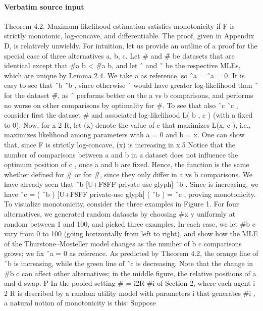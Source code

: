 \documentclass[10pt]{article}
\begin{document}
\paragraph{Verbatim source input}
\begin{ReviewVerbatim}
Theorem 4.2. Maximum likelihood estimation satisfies monotonicity if F is strictly monotonic,
log-concave, and differentiable.
The proof, given in Appendix D, is relatively unwieldy. For intuition, let us provide an outline of
a proof for the special case of three alternatives a, b, c. Let # and #̃ be datasets that are identical
except that #{a b} < #̃{a b}, and let ˆ and ˜ be the respective MLEs, which are unique by
Lemma 2.4. We take a as reference, so ˆa = ˜a = 0. It is easy to see that ˆb       ˜b , since otherwise
 ˆ would have greater log-likelihood than ˜ for the dataset #̃, as ˆ performs better on the a vs b
comparisons, and performs no worse on other comparisons by optimality for #. To see that also
 ˆc    ˜c , consider first the dataset # and associated log-likelihood L( b , c ) (with a fixed to 0).
Now, for x 2 R, let (x) denote the value of c that maximizes L(x, c ), i.e., maximizes likelihood
among parameters with a = 0 and b = x. One can show that, since F is strictly log-concave,
  (x) is increasing in x.5 Notice that the number of comparisons between a and b in a dataset does
not influence the optimum position of c , once a and b are fixed. Hence, the function is the same
whether defined for # or for #̃, since they only differ in a vs b comparisons. We have already seen
that ˜b [U+F8FF private-use glyph] ˆb . Since is increasing, we have ˜c = ( ˜b ) [U+F8FF private-use glyph] ( ˆb ) = ˆc , proving monotonicity.
To visualize monotonicity, consider the three examples in Figure 1. For four alternatives, we generated
random datasets by choosing #{x y} uniformly at random between 1 and 100, and picked three
examples. In each case, we let #{b           c} vary from 0 to 100 (going horizontally from left to
right), and show how the MLE of the Thurstone–Mosteller model changes as the number of b c
comparisons grows; we fix ˆa = 0 as reference. As predicted by Theorem 4.2, the orange line of ˆb
is increasing, while the green line of ˆc is decreasing. Note that the change in #{b c} can affect
other alternatives; in the middle figure, the relative positions of a and d swap.
                            P
In the pooled setting # = i2R #i of Section 2, where each agent i 2 R is described by a random
utility model with parameters i that generates #i , a natural notion of monotonicity is this: Suppose

\end{ReviewVerbatim}
\end{document}
